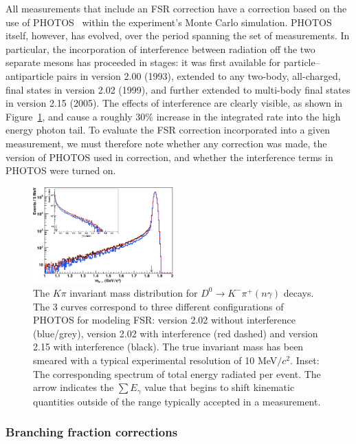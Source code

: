 All measurements that include an FSR correction 
have a correction based on the use of 
PHOTOS~\cite{Barberio:1990ms,Barberio:1993qi,Golonka:2005pn,Golonka:2006tw} 
within the experiment's Monte Carlo simulation.  
PHOTOS itself, however, has evolved, over the period spanning the set of
measurements.  In particular, the incorporation of interference between
radiation off %
the two separate mesons has proceeded in stages: it was first
available for particle--antiparticle pairs in version 2.00 (1993), extended 
to any two-body, all-charged, final states in version 2.02 (1999), and 
further extended to multi-body final states in version 2.15 (2005).
The effects of interference are clearly visible, as shown in
Figure~\ref{fig:FSR_mass_shift}, and cause a 
roughly 30\% increase in the integrated rate into 
the high energy photon tail.  To evaluate the FSR 
correction incorporated into a given measurement, 
we must therefore note whether any correction was 
made, the version of PHOTOS used in correction, 
and whether the interference terms in PHOTOS were 
turned on.  
\begin{figure}[bh]
\begin{center}
\includegraphics[width=0.48\textwidth,angle=0.]{figures/charm/FSR_mkpi.pdf}
\caption{The $K\pi$ invariant mass distribution for 
$D^0\to K^-\pi^+ (n\gamma)$ decays. The 3 curves correspond 
to three different configurations of PHOTOS for modeling FSR: 
version 2.02 without interference (blue/grey), version 2.02 with 
interference (red dashed) and version 2.15 with interference (black).  
The true invariant mass has been smeared with a typical experimental 
resolution of 10 MeV${}/c^2$.  Inset: The corresponding spectrum of 
total energy radiated per event.  The arrow indicates the $\sum E_\gamma$ 
value that begins to shift kinematic quantities outside of the range 
typically accepted in a measurement.}
\label{fig:FSR_mass_shift}
\end{center}
\end{figure}


\subsubsection{Branching fraction corrections}

